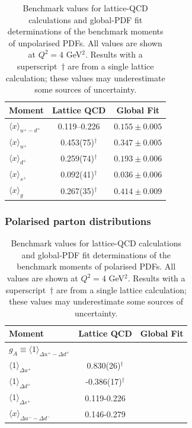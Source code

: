 {%
\begin{table}[!t]
\centering
\begin{tabular}{lcc}
\toprule
Moment & Lattice QCD & Global Fit\\
\midrule
$\langle x \rangle_{u^+ -d^+}$ 
& \numrange{0.119}{0.226} 
& $0.155\pm 0.005$\\
$\langle x \rangle_{u^+}$     
& 0.453(75)$^\dagger$ 
& $0.347\pm 0.005$\\
$\langle x \rangle_{d^+}$     
& 0.259(74)$^\dagger$ 
& $0.193\pm 0.006$\\
$\langle x \rangle_{s^+}$     
& 0.092(41)$^\dagger$ 
& $0.036\pm 0.006$\\
$\langle x\rangle_{g}$       
& 0.267(35)$^\dagger$ 
& $0.414\pm 0.009$\\
\bottomrule
\end{tabular}
\caption{\small Benchmark values for lattice-QCD calculations and global-PDF 
fit determinations of the benchmark moments of unpolarised PDFs.
%
All values are shown at $Q^2=4$ GeV$^2$.
%
Results with a superscript~$\dagger$ are from a single lattice 
calculation; these values may underestimate some sources of uncertainty.}
\label{tab:LQCDunpol}
\end{table}

\subsubsection{Polarised parton distributions}

\begin{table}[!t]
\centering
\begin{tabular}{lcc}
\toprule
Moment & Lattice QCD & Global Fit\\
\midrule
$g_A\equiv\langle 1\rangle_{\Delta u^+ - \Delta d^+}$ 
&  
& \\
$\langle 1 \rangle_{\Delta u^+}$     
& 0.830(26)$^\dagger$ 
& \\
$\langle 1 \rangle_{\Delta d^+}$     
& -0.386(17)$^\dagger$ 
& \\
$\langle 1 \rangle_{\Delta s^+}$     
& 0.119-0.226 
& \\
$\langle x\rangle_{\Delta u^- - \Delta d^-}$       
& 0.146-0.279 
& \\
\bottomrule
\end{tabular}
\caption{\small Benchmark values for lattice-QCD calculations and global-PDF 
fit determinations of the benchmark moments of polarised PDFs.
%
All values are shown at $Q^2=4$ GeV$^2$.
%
Results with a superscript~$\dagger$ are from a single lattice 
calculation; these values may underestimate some sources of uncertainty.}
\label{tab:LQCDunpol}
\end{table}










}
